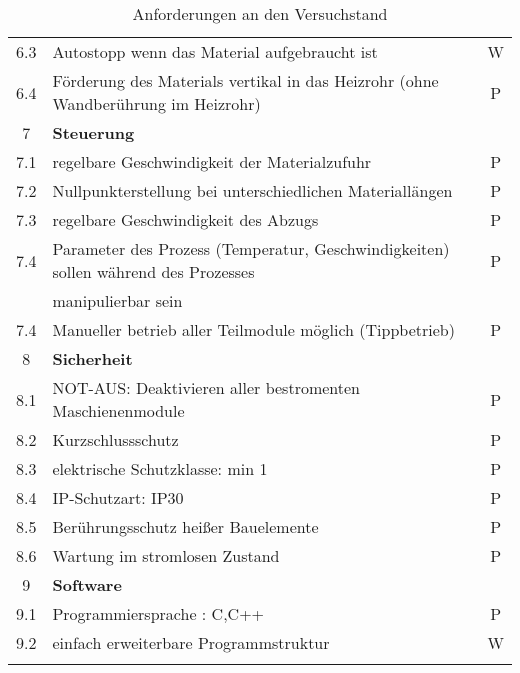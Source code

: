 \begin{center}
\begin{longtable}{|c| l| c|}
  6.3 & Autostopp wenn das Material aufgebraucht ist & W \\
  6.4 & Förderung des Materials vertikal in das Heizrohr (ohne Wandberührung im Heizrohr)  & P\\
  \hline
  7 & \textbf{Steuerung} & \\  
  7.1 &  regelbare Geschwindigkeit der Materialzufuhr & P \\
  7.2 & Nullpunkterstellung bei unterschiedlichen Materiallängen & P\\
  7.3 & regelbare Geschwindigkeit des Abzugs &  P \\
  7.4 & Parameter des Prozess (Temperatur, Geschwindigkeiten) sollen während des Prozesses  & P\\
  & manipulierbar sein&\\
  7.4 & Manueller betrieb aller Teilmodule möglich (Tippbetrieb)& P\\
  \hline
  8 & \textbf{Sicherheit}&\\
  8.1 & NOT-AUS: Deaktivieren aller bestromenten Maschienenmodule &P\\
  8.2 & Kurzschlussschutz & P \\
  8.3 & elektrische Schutzklasse: min 1 & P \\
  8.4 & IP-Schutzart: IP30 & P \\
  8.5 & Berührungsschutz heißer Bauelemente & P\\
  8.6 & Wartung im stromlosen Zustand & P\\
 \hline
 9& \textbf{Software}&\\
 9.1 & Programmiersprache : C,C++ & P\\
 9.2 & einfach erweiterbare Programmstruktur & W\\
 \hline
 \caption{Anforderungen an den Versuchstand}
 \label{tab:anforderungsliste}
\end{longtable}
\end{center}